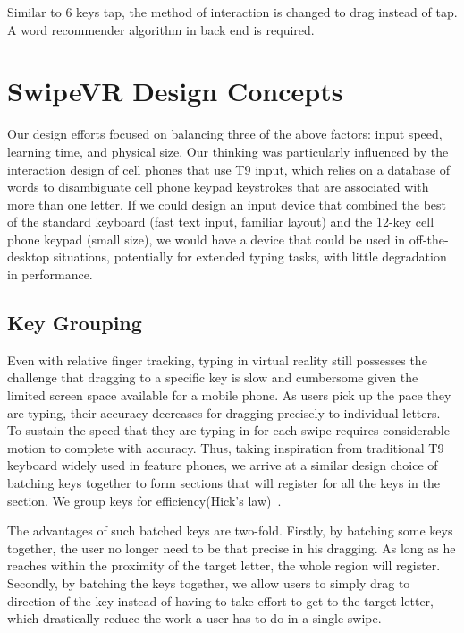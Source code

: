 \documentclass{sigchi}
\begin{document}
Similar to 6 keys tap, the method of interaction is changed to drag instead of tap.
A word recommender algorithm in back end is required.


\section{SwipeVR  Design Concepts }
Our design efforts focused on balancing three of the above factors: input speed, learning time, and physical size.
Our thinking was particularly influenced by the interaction design of cell phones that use T9 input, which relies on a database of words to disambiguate cell phone keypad keystrokes that are associated with more than one letter.
If we could design an input device that combined the best of the standard keyboard (fast text input, familiar layout) and the 12-key cell phone keypad (small size), we would have a device that could be used in off-the-desktop situations, potentially for extended typing tasks, with little degradation in performance. 

\subsection{Key Grouping}
Even with relative finger tracking, typing in virtual reality still possesses the challenge that dragging to a specific key is slow and cumbersome given the limited screen space available for a mobile phone.
As users pick up the pace they are typing, their accuracy decreases for dragging precisely to individual letters.
To sustain the speed that they are typing in for each swipe requires considerable motion to complete with accuracy.
Thus, taking inspiration from traditional T9 keyboard widely used in feature phones, we arrive at a similar design choice of batching keys together to form sections that will register for all the keys in the section.
We group keys for efficiency(Hick's law)~\cite{card1983psychology}.

The advantages of such batched keys are two-fold.
Firstly, by batching some keys together, the user no longer need to be that precise in his dragging.
As long as he reaches within the proximity of the target letter, the whole region will register.
Secondly, by batching the keys together, we allow users to simply drag to direction of the key instead of having to take effort to get to the target letter, which drastically reduce the work a user has to do in a single swipe.
\end{document}
